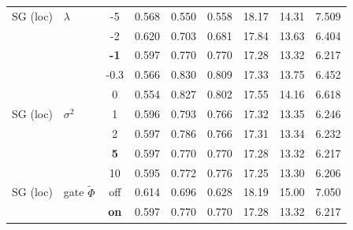 \begin{longtable}{@{}l l c c c c c c c@{}}
\midrule
SG (loc) & $\lambda$ & {-}5 & 0.568 & 0.550 & 0.558 & 18.17 & 14.31 & 7.509 \\
 &  & {-}2 & 0.620 & 0.703 & 0.681 & 17.84 & 13.63 & 6.404 \\
 &  & \textbf{{-}1} & 0.597 & 0.770 & 0.770 & 17.28 & 13.32 & 6.217 \\
 &  & {-}0.3 & 0.566 & 0.830 & 0.809 & 17.33 & 13.75 & 6.452 \\
 &  & 0 & 0.554 & 0.827 & 0.802 & 17.55 & 14.16 & 6.618 \\
\midrule
SG (loc) & $\sigma^2$ & 1 & 0.596 & 0.793 & 0.766 & 17.32 & 13.35 & 6.246 \\
 &  & 2 & 0.597 & 0.786 & 0.766 & 17.31 & 13.34 & 6.232 \\
 &  & \textbf{5} & 0.597 & 0.770 & 0.770 & 17.28 & 13.32 & 6.217 \\
 &  & 10 & 0.595 & 0.772 & 0.776 & 17.25 & 13.30 & 6.206 \\
\midrule
SG (loc) & gate $\tilde\Phi$ & off & 0.614 & 0.696 & 0.628 & 18.19 & 15.00 & 7.050 \\
 &  & \textbf{on} & 0.597 & 0.770 & 0.770 & 17.28 & 13.32 & 6.217 \\
\end{longtable}
